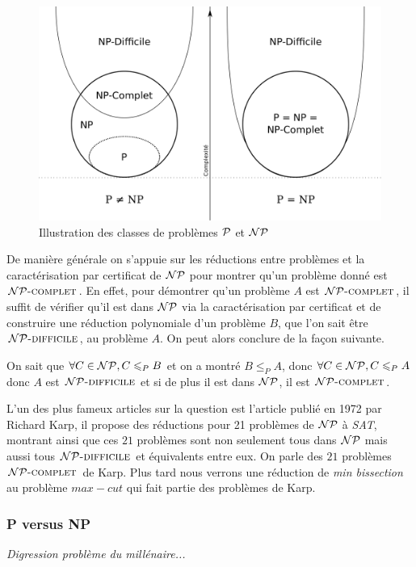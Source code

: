 \documentclass{standalone}
\begin{document}
\begin{figure}[H]
	\centering
	\includegraphics[scale=0.15]{img/pvsnp.png}
	\caption{Illustration des classes de problèmes $\mathcal{P}$ et $\mathcal{NP}$}
\end{figure}

De manière générale on s'appuie sur les réductions entre problèmes et la caractérisation par certificat de $\mathcal{NP}$ pour montrer qu'un problème donné est $\mathcal{NP}\text{\textsc{-complet}}$. En effet, pour démontrer qu'un problème $A$ est $\mathcal{NP}\text{\textsc{-complet}}$, il suffit de vérifier qu'il est dans $\mathcal{NP}$ via la caractérisation par certificat et de construire une réduction polynomiale d'un problème $B$, que l'on sait être $\mathcal{NP}\text{\textsc{-difficile}}$, au problème $A$. On peut alors conclure de la façon suivante.

On sait que $\forall C \in \mathcal{NP}, C \leqslant_P B$ et on a montré $B \leq_P A$, donc $\forall C \in \mathcal{NP}, C \leqslant_P A$ donc $A$ est $\mathcal{NP}\text{\textsc{-difficile}}$ et si de plus il est dans $\mathcal{NP}$, il est $\mathcal{NP}\text{\textsc{-complet}}$.

L'un des plus fameux articles sur la question est l'article publié en 1972 par Richard Karp\cite{21karp}, il propose des réductions pour 21 problèmes de $\mathcal{NP}$ à \textit{SAT}, montrant ainsi que ces $21$ problèmes sont non seulement tous dans $\mathcal{NP}$ mais aussi tous $\mathcal{NP}\text{\textsc{-difficile}}$ et équivalents entre eux. On parle des $21$ problèmes $\mathcal{NP}\text{\textsc{-complet}}$ de Karp. Plus tard nous verrons une réduction de \emph{min bissection} au problème $max-cut$ qui fait partie des problèmes de Karp.

\subsubsection{P versus NP}

\textit{Digression problème du millénaire...}
\end{document}
